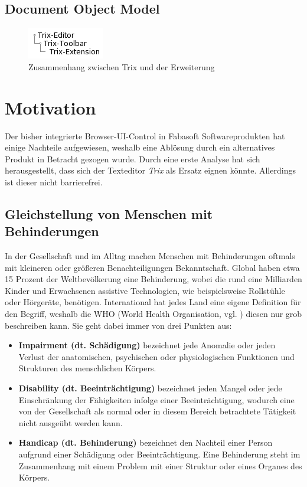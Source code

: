 \subsection{Document Object Model}
\begin{figure}[H]
\begin{center}
	\includegraphics[scale=1]{images/dom_tree.png}
\end{center}
	\caption{Zusammenhang zwischen Trix und der Erweiterung}
\end{figure}

\section{Motivation}
Der bisher integrierte Browser-UI-Control in Fabasoft Softwareprodukten hat einige Nachteile aufgewiesen, weshalb eine Ablösung durch ein alternatives Produkt in Betracht gezogen wurde. Durch eine erste Analyse hat sich herausgestellt, dass sich der Texteditor {\em{Trix}} als Ersatz eignen könnte. Allerdings ist dieser nicht barrierefrei.

\subsection{Gleichstellung von Menschen mit Behinderungen}
In der Gesellschaft und im Alltag machen Menschen mit Behinderungen oftmals mit kleineren oder größeren Benachteiligungen Bekanntschaft. Global haben 
etwa 15 Prozent der Weltbevölkerung eine Behinderung, wobei die rund eine Milliarden Kinder und Erwachsenen assistive Technologien, wie beispielsweise 
Rollstühle oder Hörgeräte, benötigen. International hat jedes Land eine eigene Definition für den Begriff, weshalb die 
WHO (World Health Organisation, vgl. \cite{who_disability_2011}) diesen nur grob beschreiben kann. Sie geht dabei immer von drei Punkten aus:

\begin{itemize}
    \item \textbf{Impairment (dt. Schädigung)} bezeichnet jede Anomalie oder jeden Verlust der anatomischen, psychischen oder physiologischen Funktionen 
    und Strukturen des menschlichen Körpers.
    \item \textbf{Disability (dt. Beeinträchtigung)} bezeichnet jeden Mangel oder jede Einschränkung der Fähigkeiten infolge einer Beeinträchtigung, 
    wodurch eine von der Gesellschaft als normal oder in diesem Bereich betrachtete Tätigkeit nicht ausgeübt werden kann.
    \item \textbf{Handicap (dt. Behinderung)} bezeichnet den Nachteil einer Person aufgrund einer Schädigung oder Beeinträchtigung. Eine Behinderung
    steht im Zusammenhang mit einem Problem mit einer Struktur oder eines Organes des Körpers.
\end{itemize}

